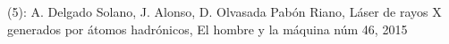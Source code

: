 \documentclass[preview]{standalone}
\begin{document}
\begin{center}
(5): A. Delgado Solano, J. Alonso, D. Olvasada Pabón Riano, Láser de rayos X generados por átomos hadrónicos, El hombre y la máquina núm 46, 2015
\end{center}
\end{document}
